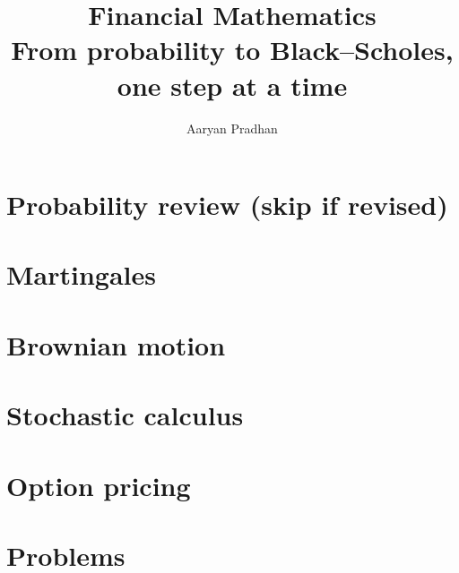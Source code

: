\documentclass[11pt,oneside]{book}
\title{Financial Mathematics\\[0.3em]\large From probability to Black--Scholes, one step at a time}
\author{Aaryan Pradhan}
\date{}
\begin{document}
\frontmatter
\maketitle
\tableofcontents


\mainmatter
\renewcommand{\thepart}{\arabic{part}}\setcounter{part}{-1}
\part{Probability review (skip if revised)}





\part{Martingales}




\part{Brownian motion}







\part{Stochastic calculus}




\part{Option pricing}










\part{Problems}




\end{document}
